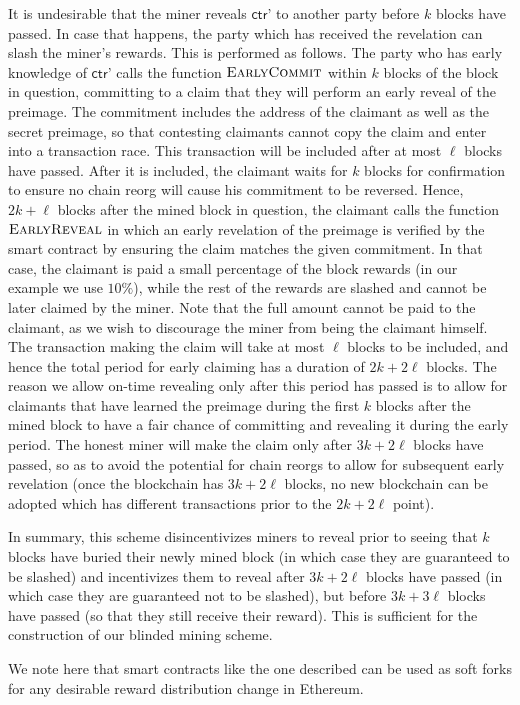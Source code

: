 It is undesirable that the miner reveals $\textsf{ctr'}$ to another party before
$k$ blocks have passed. In case that happens, the party which has received the
revelation can slash the miner's rewards. This is performed as follows. The
party who has early knowledge of $\textsf{ctr'}$ calls the function
$\textsc{EarlyCommit}$ within $k$ blocks of the block in question, committing to
a claim that they will perform an early reveal of the preimage. The commitment
includes the address of the claimant as well as the secret preimage, so that
contesting claimants cannot copy the claim and enter into a transaction race.
This transaction will be included after at most $\ell$ blocks have passed. After it
is included, the claimant waits for $k$ blocks for confirmation to ensure no chain reorg
will cause his commitment to be reversed. Hence, $2k + \ell$ blocks after the
mined block in question, the claimant calls the function $\textsc{EarlyReveal}$
in which an early revelation of the preimage is verified by the smart contract
by ensuring the claim matches the given commitment. In that case, the claimant
is paid a small percentage of the block rewards (in our example we use $10\%$),
while the rest of the rewards are slashed and cannot be later claimed by the
miner. Note that the full amount cannot be paid to the claimant, as we wish to
discourage the miner from being the claimant himself. The transaction making the claim
will take at most $\ell$ blocks to be included, and hence the total period for
early claiming has a duration of $2k + 2\ell$ blocks. The reason we allow
on-time revealing only after this period has passed is to allow for claimants
that have learned the preimage during the first $k$ blocks after the mined block
to have a fair chance of committing and revealing it during the early period.
The honest miner will make the claim only after $3k + 2\ell$ blocks have passed,
so as to avoid the potential for chain reorgs to allow for subsequent early
revelation (once the blockchain has $3k + 2\ell$ blocks, no new blockchain can
be adopted which has different transactions prior to the $2k + 2\ell$ point).

In summary, this scheme disincentivizes miners to reveal prior to seeing that
$k$ blocks have buried their newly mined block (in which case they are
guaranteed to be slashed) and incentivizes them to reveal
after $3k + 2\ell$ blocks have passed (in which case they are guaranteed not to
be slashed), but before $3k + 3\ell$ blocks have passed (so that they still
receive their reward). This is sufficient for the construction of our blinded
mining scheme.

We note here that smart contracts like the one described can be used as soft
forks for any desirable reward distribution change in Ethereum.
